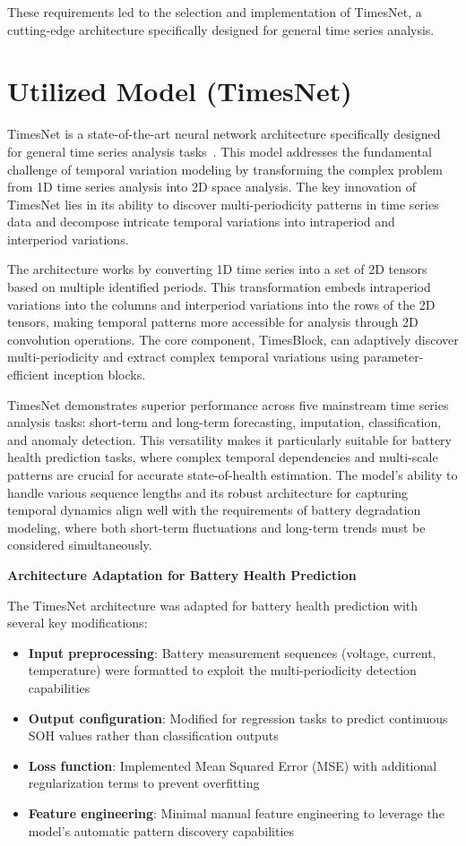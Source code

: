 These requirements led to the selection and implementation of TimesNet, a cutting-edge architecture specifically designed for general time series analysis.

\section{Utilized Model (TimesNet)}

TimesNet is a state-of-the-art neural network architecture specifically designed for general time series analysis tasks~\cite{wu_timesnet_2023}. This model addresses the fundamental challenge of temporal variation modeling by transforming the complex problem from 1D time series analysis into 2D space analysis. The key innovation of TimesNet lies in its ability to discover multi-periodicity patterns in time series data and decompose intricate temporal variations into intraperiod and interperiod variations.

The architecture works by converting 1D time series into a set of 2D tensors based on multiple identified periods. This transformation embeds intraperiod variations into the columns and interperiod variations into the rows of the 2D tensors, making temporal patterns more accessible for analysis through 2D convolution operations. The core component, TimesBlock, can adaptively discover multi-periodicity and extract complex temporal variations using parameter-efficient inception blocks.

TimesNet demonstrates superior performance across five mainstream time series analysis tasks: short-term and long-term forecasting, imputation, classification, and anomaly detection. This versatility makes it particularly suitable for battery health prediction tasks, where complex temporal dependencies and multi-scale patterns are crucial for accurate state-of-health estimation. The model's ability to handle various sequence lengths and its robust architecture for capturing temporal dynamics align well with the requirements of battery degradation modeling, where both short-term fluctuations and long-term trends must be considered simultaneously.

\textbf{Architecture Adaptation for Battery Health Prediction}

The TimesNet architecture was adapted for battery health prediction with several key modifications:

\begin{itemize}
    \item \textbf{Input preprocessing}: Battery measurement sequences (voltage, current, temperature) were formatted to exploit the multi-periodicity detection capabilities
    \item \textbf{Output configuration}: Modified for regression tasks to predict continuous SOH values rather than classification outputs
    \item \textbf{Loss function}: Implemented Mean Squared Error (MSE) with additional regularization terms to prevent overfitting
    \item \textbf{Feature engineering}: Minimal manual feature engineering to leverage the model's automatic pattern discovery capabilities
\end{itemize}

